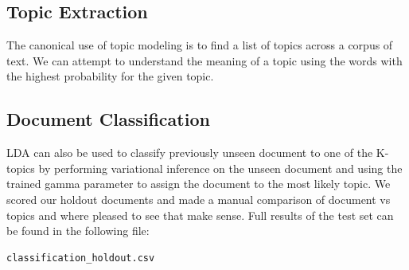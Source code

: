 \documentclass[11pt]{article}
\begin{document}
\subsection{Topic Extraction}
The canonical use of topic modeling is to find a list of topics across a corpus of text. We can attempt to understand the meaning of a topic using the words with the highest probability for the given topic. %
\begin{table}[h]
\caption{Topic Sample from LDA model: each column represents the top 10 words from the topic. We can see that the topics are easy to interpret. for full list of topic, see: }%

\end{table}

\subsection{Document Classification}
LDA can also be used to classify previously unseen document to one of the K-topics by performing variational inference on the unseen document and using the trained gamma parameter to assign the document to the most likely topic. We scored our holdout documents and made a manual comparison of document vs topics and where pleased to see that make sense. Full results of the test set can be found in the following file: \begin{verbatim}
classification_holdout.csv 
\end{verbatim}
\end{document}
